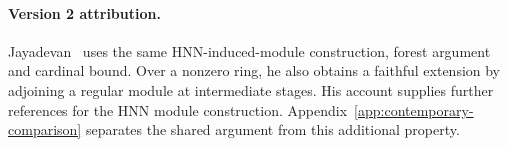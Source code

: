 
\paragraph{Version 2 attribution.}
Jayadevan~\cite{jayadevan-17-101} uses the same HNN-induced-module
construction, forest argument and cardinal bound. Over a nonzero ring,
he also obtains a faithful extension by adjoining a regular module at
intermediate stages. His account supplies further references for the
HNN module construction. Appendix~\ref{app:contemporary-comparison}
separates the shared argument from this additional property.
